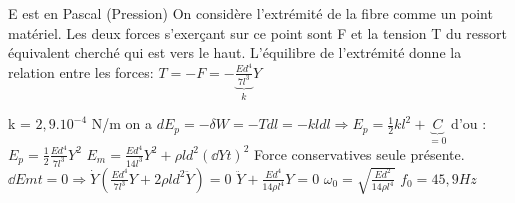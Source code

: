 \begin{Answer}
	\Question E est en Pascal (Pression)
	\Question On considère l’extrémité de la fibre comme un point matériel. Les
    deux forces s’exerçant sur ce point sont F et la tension T du ressort
    équivalent cherché qui est vers le haut. L’équilibre de l’extrémité donne la
    relation entre les forces: $T= -F =- \underbrace{\frac{Ed^4}{7l^3}}_{k}Y $

	\Question k = $2,9.10^{-4}$ N/m
	\Question  on a $dE_p= -\delta W= -T dl = -kldl  \Rightarrow E_p= \frac{1}{2}kl^2 + \underbrace{C}_{=0}$
	d'ou : $E_p = \frac{1}{2}\frac{Ed^4}{7l^3}Y^2$
	\Question $E_m=\frac{Ed^4}{14l^3}Y^2+\rho l d^2 \left(\dd{Y}{t}\right)^2$
	\Question Force conservatives seule présente.
	$\dd{Em}{t}=0 \Rightarrow \dot{Y}\left(\frac{Ed^4}{7l^3}Y+2\rho ld^2 \ddot{Y}\right) =0$
	$\ddot{Y}+\frac{Ed^4}{14\rho l^4}Y=0$
	\Question $\omega_0= \sqrt{\frac{Ed^2}{14\rho l^4}} $
	\Question $f_0=45,9Hz$
\end{Answer}
